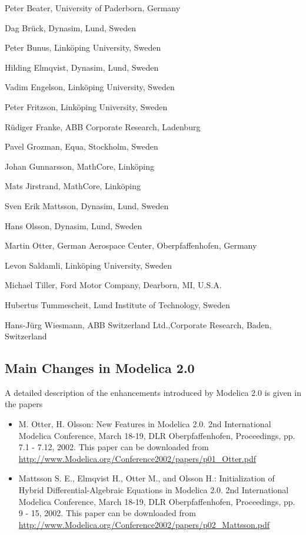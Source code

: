 \documentclass[10pt,a4paper]{report}
\def\doublelabel#1{\label{#1}}
\begin{document}
Peter Beater, University of Paderborn, Germany

Dag Brück, Dynasim, Lund, Sweden

Peter Bunus, Linköping University, Sweden

Hilding Elmqvist, Dynasim, Lund, Sweden

Vadim Engelson, Linköping University, Sweden

Peter Fritzson, Linköping University, Sweden

Rüdiger Franke, ABB Corporate Research, Ladenburg

Pavel Grozman, Equa, Stockholm, Sweden

Johan Gunnarsson, MathCore, Linköping

Mats Jirstrand, MathCore, Linköping

Sven Erik Mattsson, Dynasim, Lund, Sweden

Hans Olsson, Dynasim, Lund, Sweden

Martin Otter, German Aerospace Center, Oberpfaffenhofen, Germany

Levon Saldamli, Linköping University, Sweden

Michael Tiller, Ford Motor Company, Dearborn, MI, U.S.A.

Hubertus Tummescheit, Lund Institute of Technology, Sweden

Hans-Jürg Wiesmann, ABB Switzerland Ltd.,Corporate Research, Baden,
Switzerland

\subsection{Main Changes in Modelica 2.0}\doublelabel{main-changes-in-modelica-2-0}

A detailed description of the enhancements introduced by Modelica 2.0 is
given in the papers

\begin{itemize}
\item
  M. Otter, H. Olsson: New Features in Modelica 2.0. 2nd International
  Modelica Conference, March 18-19, DLR Oberpfaffenhofen, Proceedings,
  pp. 7.1 - 7.12, 2002. This paper can be downloaded from
  \url{http://www.Modelica.org/Conference2002/papers/p01\_Otter.pdf}
\item
  Mattsson S. E., Elmqvist H., Otter M., and Olsson H.: Initialization
  of Hybrid Differential-Algebraic Equations in Modelica 2.0. 2nd
  International Modelica Conference, March 18-19, DLR Oberpfaffenhofen,
  Proceedings, pp. 9 - 15, 2002. This paper can be downloaded from
  \url{http://www.Modelica.org/Conference2002/papers/p02\_Mattsson.pdf}
\end{itemize}
\end{document}
